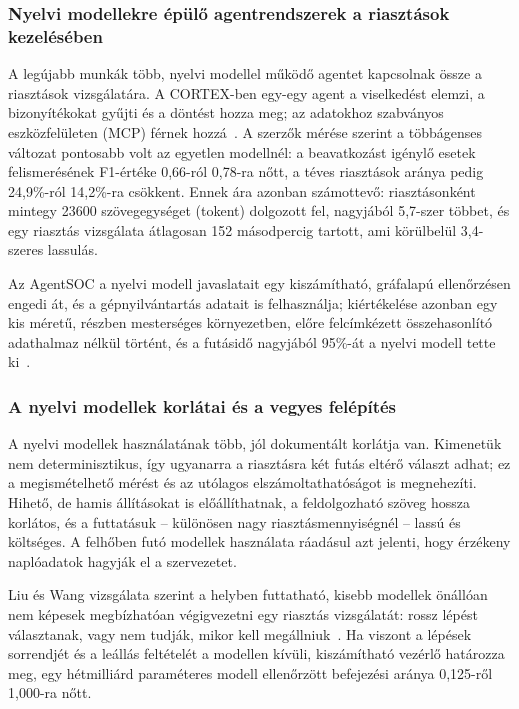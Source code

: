 \subsubsection{Nyelvi modellekre épülő agentrendszerek a riasztások kezelésében}
A legújabb munkák több, nyelvi modellel működő agentet kapcsolnak össze a riasztások vizsgálatára. A CORTEX-ben egy-egy agent a viselkedést elemzi, a bizonyítékokat gyűjti és a döntést hozza meg; az adatokhoz szabványos eszközfelületen (\ac{MCP}) férnek hozzá~\cite{wei2025cortex}. A szerzők mérése szerint a többágenses változat pontosabb volt az egyetlen modellnél: a beavatkozást igénylő esetek felismerésének F1-értéke 0,66-ról 0,78-ra nőtt, a téves riasztások aránya pedig 24,9\%-ról 14,2\%-ra csökkent. Ennek ára azonban számottevő: riasztásonként mintegy 23600 szövegegységet (tokent) dolgozott fel, nagyjából 5,7-szer többet, és egy riasztás vizsgálata átlagosan 152 másodpercig tartott, ami körülbelül 3,4-szeres lassulás.

Az AgentSOC a nyelvi modell javaslatait egy kiszámítható, gráfalapú ellenőrzésen engedi át, és a gépnyilvántartás adatait is felhasználja; kiértékelése azonban egy kis méretű, részben mesterséges környezetben, előre felcímkézett összehasonlító adathalmaz nélkül történt, és a futásidő nagyjából 95\%-át a nyelvi modell tette ki~\cite{roy2026agentsoc}.

\subsubsection{A nyelvi modellek korlátai és a vegyes felépítés}
A nyelvi modellek használatának több, jól dokumentált korlátja van. Kimenetük nem determinisztikus, így ugyanarra a riasztásra két futás eltérő választ adhat; ez a megismételhető mérést és az utólagos elszámoltathatóságot is megnehezíti. Hihető, de hamis állításokat is előállíthatnak, a feldolgozható szöveg hossza korlátos, és a futtatásuk -- különösen nagy riasztásmennyiségnél -- lassú és költséges. A felhőben futó modellek használata ráadásul azt jelenti, hogy érzékeny naplóadatok hagyják el a szervezetet.

Liu és Wang vizsgálata szerint a helyben futtatható, kisebb modellek önállóan nem képesek megbízhatóan végigvezetni egy riasztás vizsgálatát: rossz lépést választanak, vagy nem tudják, mikor kell megállniuk~\cite{liu2026hesp}. Ha viszont a lépések sorrendjét és a leállás feltételét a modellen kívüli, kiszámítható vezérlő határozza meg, egy hétmilliárd paraméteres modell ellenőrzött befejezési aránya 0,125-ről 1,000-ra nőtt.

